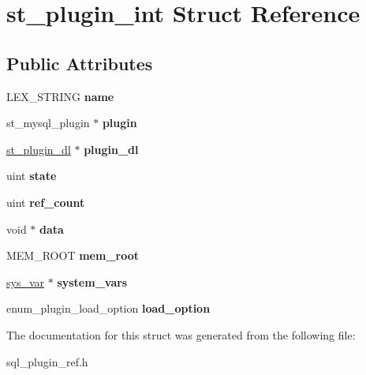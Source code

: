 \hypertarget{structst__plugin__int}{}\section{st\+\_\+plugin\+\_\+int Struct Reference}
\label{structst__plugin__int}
\subsection*{Public Attributes}
\begin{DoxyCompactItemize}
\item 
\mbox{\label{structst__plugin__int_ab7ea80bd489aa51594b1d8238eff6dba}} 
L\+E\+X\+\_\+\+S\+T\+R\+I\+NG {\bfseries name}
\item 
\mbox{\label{structst__plugin__int_a995ae9c02d5a31d40663939bd7c0ff73}} 
st\+\_\+mysql\+\_\+plugin $\ast$ {\bfseries plugin}
\item 
\mbox{\label{structst__plugin__int_aa1bee552cf98cfafc462786717e971a8}} 
\mbox{\hyperlink{structst__plugin__dl}{st\+\_\+plugin\+\_\+dl}} $\ast$ {\bfseries plugin\+\_\+dl}
\item 
\mbox{\label{structst__plugin__int_a266e685670417353cdc07b4f0d6f27fc}} 
uint {\bfseries state}
\item 
\mbox{\label{structst__plugin__int_a69df91f70ccab1ec6ecb94dfa76ca7ab}} 
uint {\bfseries ref\+\_\+count}
\item 
\mbox{\label{structst__plugin__int_a7d9c680d91ceeca2dafca685bd75c4fb}} 
void $\ast$ {\bfseries data}
\item 
\mbox{\label{structst__plugin__int_a537a7cb6a67d18321db64853acb8f4b0}} 
M\+E\+M\+\_\+\+R\+O\+OT {\bfseries mem\+\_\+root}
\item 
\mbox{\label{structst__plugin__int_a84a87057dff96934856af76a4c82611e}} 
\mbox{\hyperlink{classsys__var}{sys\+\_\+var}} $\ast$ {\bfseries system\+\_\+vars}
\item 
\mbox{\label{structst__plugin__int_a95c5748cdb574025c4d1e5f6588a6880}} 
enum\+\_\+plugin\+\_\+load\+\_\+option {\bfseries load\+\_\+option}
\end{DoxyCompactItemize}


The documentation for this struct was generated from the following file\+:\begin{DoxyCompactItemize}
\item 
sql\+\_\+plugin\+\_\+ref.\+h\end{DoxyCompactItemize}
